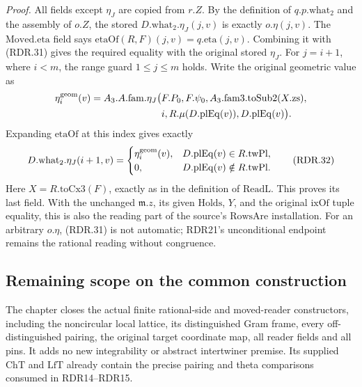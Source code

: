 \emph{Proof.}
All fields except \(\eta_J\) are copied from \(r.Z\).
By the definition of \(q.p.\mathrm{what}_2\) and the
assembly of \(o.Z\), the stored \(D.\mathrm{what}_2.\eta_J(j,v)\)
is exactly \(o.\eta(j,v)\).  The \(\mathrm{Moved.eta}\)
field says
\(\mathrm{etaOf}(R,F)(j,v)=q.\mathrm{eta}(j,v)\).
Combining it with (RDR.31) gives the required equality
with the original stored \(\eta_J\).
For \(j=i+1\), where \(i<m\), the range guard
\(1\le j\le m\) holds.  Write the original geometric value as
\[
 \begin{aligned}
 \eta_i^{\rm geom}(v)=A_3.A.\mathrm{fam}.\eta_J\bigl(
   &F.P_0,F.\psi_0,A_3.\mathrm{fam3}.\mathrm{toSub2}(X.\mathrm{zs}),\\
   &i,R.\mu(D.\mathrm{plEq}(v)),D.\mathrm{plEq}(v)\bigr).
 \end{aligned}
\]
Expanding \(\mathrm{etaOf}\) at this index gives exactly
\[
 D.\mathrm{what}_2.\eta_J(i+1,v)=
 \begin{cases}
 \eta_i^{\rm geom}(v),    &D.\mathrm{plEq}(v)\in R.\mathrm{twPl},\\
 0,                       &D.\mathrm{plEq}(v)\notin R.\mathrm{twPl}.
 \end{cases}                                                   \tag{RDR.32}
\]
Here \(X=R.\mathrm{toCx3}(F)\), exactly as in the
definition of \(\mathrm{ReadL}\).  This proves its last
field.  With the unchanged \(\mathfrak m.z\), its given
\(\mathrm{Holds}\), \(Y\), and the original \(\mathrm{ixOf}\)
tuple equality, this is also the reading part of the
source's \(\mathrm{RowsAre}\) installation.  For an
arbitrary \(o.\eta\), (RDR.31) is not automatic; RDR21's
unconditional endpoint remains the rational reading
without congruence.

\subsection*{Remaining scope on the common construction}

The chapter closes the actual finite rational-side and moved-reader
constructors, including the noncircular local lattice, its distinguished
Gram frame, every off-distinguished pairing, the original target
coordinate map, all reader fields and all pins.  It adds no new
integrability or abstract intertwiner premise.  Its supplied
\(\mathrm{ChT}\) and \(\mathrm{LfT}\) already contain the precise
pairing and theta comparisons consumed in RDR14--RDR15.

